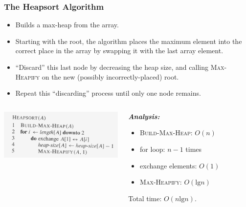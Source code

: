 \documentclass[notes,serif]{beamer}
\begin{document}
\begin{frame}
  \frametitle{The Heapsort Algorithm}
  \begin{block}{}
  {\small
  \begin{itemize}
    \item Builds a max-heap from the array. 
    \item Starting with the root, the algorithm places the maximum element into the correct place in the array by swapping it with the last array element.
    \item ``Discard'' this last node by decreasing the heap size, and calling \textsc{Max-Heapify} on the new (possibly incorrectly-placed) root.
    \item Repeat this ``discarding'' process until only one node remains.
  \end{itemize}
  }
  \end{block}

\begin{columns}
  \begin{block}{}
    \includegraphics[height=2.5cm]{06-heapsort}
  \end{block}
  
  \begin{block}{}
  {\scriptsize
  {\bf \em Analysis:}
  \begin{itemize}
    \item \textsc{Build-Max-Heap}: $O(n)$
    \item for loop: $n-1$ times
    \item exchange elements: $O(1)$
    \item \textsc{Max-Heapify}: $O(\text{lg} n)$
  \end{itemize}
  Total time: $O(n \text{lg} n)$.
  }
  \end{block}
\end{columns}
\end{frame}
\end{document}
